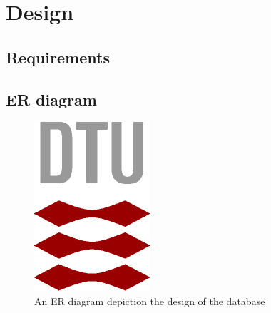 \section{Design}



\subsection{Requirements} %

\subsection{ER diagram}

\begin{figure}[h]
    \centering
    \includegraphics[width=.2\textwidth]{img/DTU-logo} %
    \caption{An ER diagram depiction the design of the database}
    \label{fig:ER}
\end{figure}

